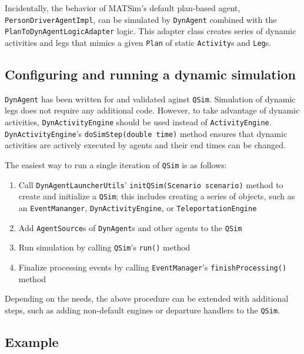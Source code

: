 Incidentally, the behavior of MATSim's default plan-based agent, \lstinline$PersonDriverAgentImpl$, can be simulated by \lstinline$DynAgent$ combined with the \lstinline$PlanToDynAgentLogicAdapter$ logic. This adapter class creates series of dynamic activities and legs that mimics a given \lstinline$Plan$ of static \lstinline$Activity$s and \lstinline$Leg$s.

\subsection{Configuring and running a dynamic simulation}
\label{sec:config-dyn-sim}

\lstinline$DynAgent$ has been written for and validated aginst \lstinline$QSim$. Simulation of dynamic legs does not require any additional code. However, to take advantage of dynamic activities,  \lstinline$DynActivityEngine$ should be used instead of \lstinline$ActivityEngine$. \lstinline$DynActivityEngine$'s \lstinline$doSimStep(double time)$ method ensures that dynamic activities are actively executed by agents and their end times can be changed.

The easiest way to run a single iteration of \lstinline$QSim$ is as follows:
%
\begin{enumerate}

	\item Call \lstinline$DynAgentLauncherUtils$' \lstinline$initQSim(Scenario scenario)$ method to create and initialize a \lstinline$QSim$; this includes creating a series of objects, such as an \lstinline$EventMananger$, \lstinline$DynActivityEngine$, or \lstinline$TeleportationEngine$

	\item Add \lstinline$AgentSource$s of \lstinline$DynAgent$s and other agents to the \lstinline$QSim$
	
	\item Run simulation by calling \lstinline$QSim$'s \lstinline$run()$ method
	
	\item Finalize processing events by calling \lstinline$EventManager$'s \lstinline$finishProcessing()$ method
	
\end{enumerate}
%
Depending on the needs, the above procedure can be extended with additional steps, such as adding non-default engines or departure handlers to the \lstinline$QSim$.

\subsection{Example}

